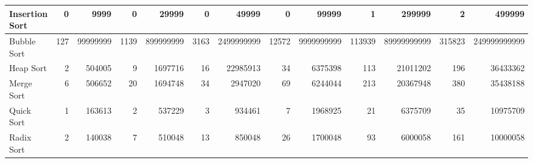\documentclass{article}
\begin{document}
\begin{table}[H]
\begin{adjustbox}{width=\columnwidth,center}
\begin{tabular}{|l|rrrrrrrrrrrr|}
Insertion Sort                     & \multicolumn{1}{r|}{0}            & \multicolumn{1}{r|}{9999}       & \multicolumn{1}{r|}{0}            & \multicolumn{1}{r|}{29999}      & \multicolumn{1}{r|}{0}            & \multicolumn{1}{r|}{49999}      & \multicolumn{1}{r|}{0}            & \multicolumn{1}{r|}{99999}      & \multicolumn{1}{r|}{1}            & \multicolumn{1}{r|}{299999}      & \multicolumn{1}{r|}{2}            & 499999                          \\ \hline
Bubble Sort                        & \multicolumn{1}{r|}{127}          & \multicolumn{1}{r|}{99999999}   & \multicolumn{1}{r|}{1139}         & \multicolumn{1}{r|}{899999999}  & \multicolumn{1}{r|}{3163}         & \multicolumn{1}{r|}{2499999999} & \multicolumn{1}{r|}{12572}        & \multicolumn{1}{r|}{9999999999} & \multicolumn{1}{r|}{113939}       & \multicolumn{1}{r|}{89999999999} & \multicolumn{1}{r|}{315823}       & 249999999999                    \\ \hline
Heap Sort                          & \multicolumn{1}{r|}{2}            & \multicolumn{1}{r|}{504005}     & \multicolumn{1}{r|}{9}            & \multicolumn{1}{r|}{1697716}    & \multicolumn{1}{r|}{16}           & \multicolumn{1}{r|}{22985913}   & \multicolumn{1}{r|}{34}           & \multicolumn{1}{r|}{6375398}    & \multicolumn{1}{r|}{113}          & \multicolumn{1}{r|}{21011202}    & \multicolumn{1}{r|}{196}          & 36433362                        \\ \hline
Merge Sort                         & \multicolumn{1}{r|}{6}            & \multicolumn{1}{r|}{506652}     & \multicolumn{1}{r|}{20}           & \multicolumn{1}{r|}{1694748}    & \multicolumn{1}{r|}{34}           & \multicolumn{1}{r|}{2947020}    & \multicolumn{1}{r|}{69}           & \multicolumn{1}{r|}{6244044}    & \multicolumn{1}{r|}{213}          & \multicolumn{1}{r|}{20367948}    & \multicolumn{1}{r|}{380}          & 35438188                        \\ \hline
Quick Sort & \multicolumn{1}{r|}{1}            & \multicolumn{1}{r|}{163613}     & \multicolumn{1}{r|}{2}            & \multicolumn{1}{r|}{537229}     & \multicolumn{1}{r|}{3}            & \multicolumn{1}{r|}{934461}     & \multicolumn{1}{r|}{7}            & \multicolumn{1}{r|}{1968925}    & \multicolumn{1}{r|}{21}           & \multicolumn{1}{r|}{6375709}     & \multicolumn{1}{r|}{35}           & 10975709                        \\ \hline
Radix Sort                         & \multicolumn{1}{r|}{2}            & \multicolumn{1}{r|}{140038}     & \multicolumn{1}{r|}{7}            & \multicolumn{1}{r|}{510048}     & \multicolumn{1}{r|}{13}           & \multicolumn{1}{r|}{850048}     & \multicolumn{1}{r|}{26}           & \multicolumn{1}{r|}{1700048}    & \multicolumn{1}{r|}{93}           & \multicolumn{1}{r|}{6000058}     & \multicolumn{1}{r|}{161}          & 10000058                        \\ \hline

\end{tabular}
\end{adjustbox}
\end{table}
\end{document}
